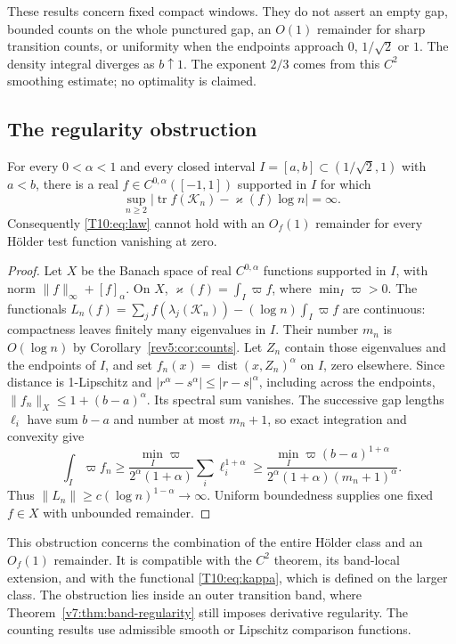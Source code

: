 These results concern fixed compact windows.  They do not assert an empty
gap, bounded counts on the whole punctured gap, an $O(1)$ remainder for
sharp transition counts, or uniformity when the endpoints approach
$0$, $1/\sqrt2$ or $1$.  The density integral diverges as $b\uparrow1$.
The exponent $2/3$ comes from this $C^2$ smoothing estimate; no optimality
is claimed.


\subsection{The regularity obstruction}\label{sec:open}
\begin{proposition}
\label{T10:prop:holder-obstruction}
For every $0<\alpha<1$ and every closed interval
$I=[a,b]\subset(1/\sqrt2,1)$ with $a<b$, there is a real
$f\in C^{0,\alpha}([-1,1])$ supported in $I$ for which
\[
 \sup_{n\ge2}\left|
 \operatorname{tr}f(\mathcal K_n)-\varkappa(f)\log n\right|=\infty.
\]
Consequently \eqref{T10:eq:law} cannot hold with an $O_f(1)$ remainder for
every H\"older test function vanishing at zero.
\end{proposition}

\begin{proof}
Let $X$ be the Banach space of real $C^{0,\alpha}$ functions supported
in $I$, with norm $\|f\|_\infty+[f]_\alpha$. On $X$,
$\varkappa(f)=\int_I\varpi f$, where $\min_I\varpi>0$.
The functionals
$L_n(f)=\sum_jf(\lambda_j(\mathcal K_n))-(\log n)\int_I\varpi f$
are continuous: compactness leaves finitely many eigenvalues in $I$.
Their number $m_n$ is $O(\log n)$ by Corollary~\ref{rev5:cor:counts}.
Let $Z_n$ contain those eigenvalues and the endpoints of $I$, and set
$f_n(x)=\operatorname{dist}(x,Z_n)^\alpha$ on $I$, zero elsewhere.
Since distance is 1-Lipschitz and $|r^\alpha-s^\alpha|\le|r-s|^\alpha$,
including across the endpoints, $\|f_n\|_X\le1+(b-a)^\alpha$.
Its spectral sum vanishes. The successive gap lengths $\ell_i$ have sum
$b-a$ and number at most $m_n+1$, so exact integration and convexity give
\[
 \int_I\varpi f_n\ge
 \frac{\min_I\varpi}{2^\alpha(1+\alpha)}\sum_i\ell_i^{1+\alpha}
 \ge\frac{\min_I\varpi(b-a)^{1+\alpha}}
 {2^\alpha(1+\alpha)(m_n+1)^\alpha}.
\]
Thus $\|L_n\|\ge c(\log n)^{1-\alpha}\to\infty$.
Uniform boundedness supplies one fixed $f\in X$ with unbounded remainder.
\end{proof}

This obstruction concerns the combination of the entire H\"older class and
an $O_f(1)$ remainder.  It is compatible with the $C^2$ theorem, its band-local extension, and with the
functional \eqref{T10:eq:kappa}, which is defined on the larger class.
The obstruction lies inside an outer transition band, where
Theorem~\ref{v7:thm:band-regularity} still imposes derivative regularity.
The counting results use admissible smooth or Lipschitz comparison functions.

